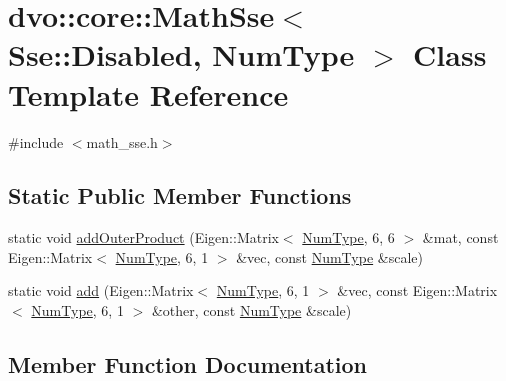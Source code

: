 \hypertarget{classdvo_1_1core_1_1_math_sse_3_01_sse_1_1_disabled_00_01_num_type_01_4}{}\section{dvo\+:\+:core\+:\+:Math\+Sse$<$ Sse\+:\+:Disabled, Num\+Type $>$ Class Template Reference}
\label{classdvo_1_1core_1_1_math_sse_3_01_sse_1_1_disabled_00_01_num_type_01_4}


{\ttfamily \#include $<$math\+\_\+sse.\+h$>$}

\subsection*{Static Public Member Functions}
\begin{DoxyCompactItemize}
\item 
static void \mbox{\hyperlink{classdvo_1_1core_1_1_math_sse_3_01_sse_1_1_disabled_00_01_num_type_01_4_ad8e43368f340963344f0d87a1a72e070}{add\+Outer\+Product}} (Eigen\+::\+Matrix$<$ \mbox{\hyperlink{namespacedvo_1_1core_ab9c199d221775a923e2549ad7e15c323}{Num\+Type}}, 6, 6 $>$ \&mat, const Eigen\+::\+Matrix$<$ \mbox{\hyperlink{namespacedvo_1_1core_ab9c199d221775a923e2549ad7e15c323}{Num\+Type}}, 6, 1 $>$ \&vec, const \mbox{\hyperlink{namespacedvo_1_1core_ab9c199d221775a923e2549ad7e15c323}{Num\+Type}} \&scale)
\item 
static void \mbox{\hyperlink{classdvo_1_1core_1_1_math_sse_3_01_sse_1_1_disabled_00_01_num_type_01_4_a354a83ac6da90d558363c2394a5b1499}{add}} (Eigen\+::\+Matrix$<$ \mbox{\hyperlink{namespacedvo_1_1core_ab9c199d221775a923e2549ad7e15c323}{Num\+Type}}, 6, 1 $>$ \&vec, const Eigen\+::\+Matrix$<$ \mbox{\hyperlink{namespacedvo_1_1core_ab9c199d221775a923e2549ad7e15c323}{Num\+Type}}, 6, 1 $>$ \&other, const \mbox{\hyperlink{namespacedvo_1_1core_ab9c199d221775a923e2549ad7e15c323}{Num\+Type}} \&scale)
\end{DoxyCompactItemize}


\subsection{Member Function Documentation}
\mbox{\label{classdvo_1_1core_1_1_math_sse_3_01_sse_1_1_disabled_00_01_num_type_01_4_a354a83ac6da90d558363c2394a5b1499}} 
